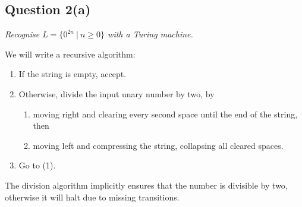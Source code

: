 \documentclass[a4paper]{article}
\begin{document}
%
%
%


\subsection*{Question 2(a)}
\begin{center}
  \textit{Recognise $L = \{0^{2n}~|~ n \ge 0\}$ with a Turing machine.}
\end{center}
We will write a recursive algorithm:
\begin{enumerate}[(1)]
  \setlength{\itemsep}{0pt}
  \item If the string is empty, accept.
  \item Otherwise, divide the input unary number by two, by
    \begin{enumerate}
      \item moving right and clearing every second space until the end of the string, then
      \item moving left and compressing the string, collapsing all cleared spaces.
    \end{enumerate}
  \item Go to (1).
\end{enumerate}
The division algorithm implicitly ensures that the number is divisible by two, otherwise it will halt
due to missing transitions.
\end{document}

